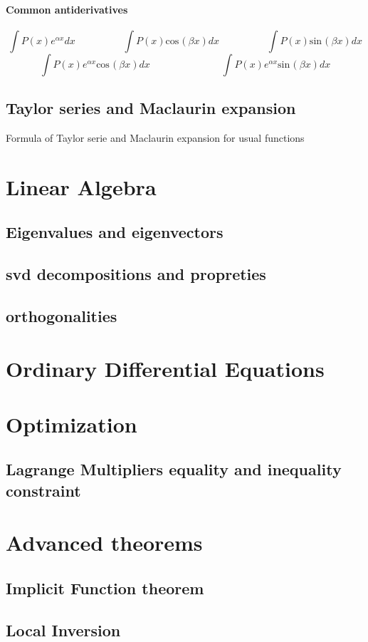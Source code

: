 \documentclass[a4paper,10pt]{article}
\newcommand{\fnc}[2]{%
  \text{#1}\hspace{1pt} #2
}
\begin{document}
\paragraph{Common antiderivatives}
\[
\int P(x)e^{\alpha x}dx \hspace{2cm} \int P(x)\fnc{cos}{(\beta x)}dx  \hspace{2cm} \int P(x)\fnc{sin}{(\beta x)}dx
\]
\[
\int P(x)e^{\alpha x}\fnc{cos}{(\beta x)}dx \hspace{3cm} \int P(x)e^{\alpha x}\fnc{sin}{(\beta x)}dx
\]

\subsection{Taylor series and Maclaurin expansion}
Formula of Taylor serie and Maclaurin expansion for usual functions
\section{Linear Algebra}
\subsection{Eigenvalues and eigenvectors}
\subsection{svd decompositions and propreties}
\subsection{orthogonalities}
\section{Ordinary Differential Equations}
\section{Optimization}
\subsection{Lagrange Multipliers equality and inequality constraint}
\section{Advanced theorems}
\subsection{Implicit Function theorem}
\subsection{Local Inversion}



\end{document}

